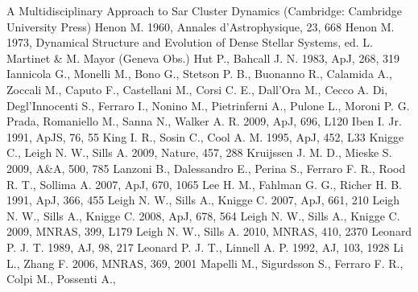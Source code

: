 \begin{thebibliography}{99}
  A Multidisciplinary Approach to Sar Cluster Dynamics (Cambridge:
  Cambridge University Press) 
 Henon M. 1960,
  Annales d'Astrophysique, 23, 668
 Henon
  M. 1973, Dynamical Structure and Evolution of Dense Stellar Systems,
  ed. L. Martinet \& M. Mayor (Geneva Obs.)
 Hut P.,
  Bahcall J. N. 1983, ApJ, 268, 319
  Iannicola G., Monelli M., Bono G., Stetson P. B., Buonanno R., 
  Calamida A., Zoccali M., Caputo F., Castellani M., Corsi C. E., 
  Dall'Ora M., Cecco A. Di, Degl'Innocenti S., Ferraro I., Nonino 
  M., Pietrinferni A., Pulone L., Moroni P. G. Prada, Romaniello 
  M., Sanna N., Walker A. R. 2009, ApJ, 696, L120
 Iben
  I. Jr. 1991, ApJS, 76, 55
  King I. R., Sosin C., Cool A. M. 1995, ApJ, 452, L33
  Knigge C., Leigh N. W., Sills A. 2009, Nature, 457, 288
 Kruijssen J. M. D., Mieske S. 2009,
  A\&A, 500, 785
 Lanzoni B., Dalessandro E., Perina S., Ferraro F. R., Rood R. T.,
 Sollima A. 2007, ApJ, 670, 1065 
  Lee H. M., Fahlman G. G., Richer H. B. 1991, ApJ, 366, 455
 Leigh
  N. W., Sills A., Knigge C. 2007, ApJ, 661, 210
 Leigh
  N. W., Sills A., Knigge C. 2008, ApJ, 678, 564
 Leigh
  N. W., Sills A., Knigge C. 2009, MNRAS, 399, L179
 Leigh
  N. W., Sills A. 2010, MNRAS, 410, 2370
 Leonard
  P. J. T. 1989, AJ, 98, 217 
 Leonard
  P. J. T., Linnell A. P. 1992, AJ, 103, 1928
 Li L.,
  Zhang F. 2006, MNRAS, 369, 2001
  Mapelli M., Sigurdsson S., Ferraro F. R., Colpi M., Possenti A.,

\end{thebibliography}
